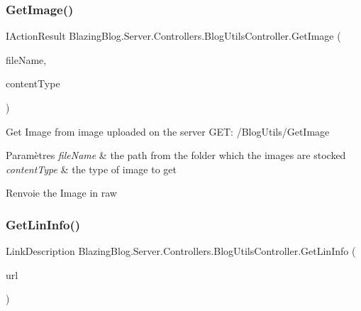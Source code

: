 \subsubsection{\texorpdfstring{Get\+Image()}{GetImage()}}
{\footnotesize\ttfamily I\+Action\+Result Blazing\+Blog.\+Server.\+Controllers.\+Blog\+Utils\+Controller.\+Get\+Image (\begin{DoxyParamCaption}\item[{\mbox{[}\+From\+Query\mbox{]} string}]{file\+Name,  }\item[{\mbox{[}\+From\+Query\mbox{]} string}]{content\+Type }\end{DoxyParamCaption})\hspace{0.3cm}{\ttfamily [inline]}}



Get Image from image uploaded on the server G\+ET\+: /\+Blog\+Utils/\+Get\+Image 


\begin{DoxyParams}{Paramètres}
{\em file\+Name} & the path from the folder which the images are stocked\\
\hline
{\em content\+Type} & the type of image to get\\
\hline
\end{DoxyParams}
\begin{DoxyReturn}{Renvoie}
the Image in raw
\end{DoxyReturn}
\mbox{\label{class_blazing_blog_1_1_server_1_1_controllers_1_1_blog_utils_controller_abb07a81ee10a101acbc979c4a217a76a}} 
\subsubsection{\texorpdfstring{Get\+Lin\+Info()}{GetLinInfo()}}
{\footnotesize\ttfamily Link\+Description Blazing\+Blog.\+Server.\+Controllers.\+Blog\+Utils\+Controller.\+Get\+Lin\+Info (\begin{DoxyParamCaption}\item[{string}]{url }\end{DoxyParamCaption})\hspace{0.3cm}{\ttfamily [inline]}}



